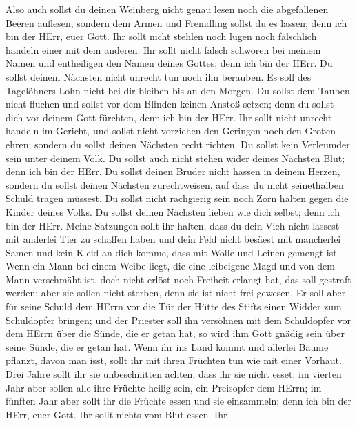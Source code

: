  Also auch sollst du deinen Weinberg nicht genau lesen noch
die abgefallenen Beeren auflesen, sondern dem Armen und Fremdling sollst
du es lassen; denn ich bin der HErr, euer Gott.  Ihr sollt
nicht stehlen noch lügen noch fälschlich handeln einer mit dem anderen.
 Ihr sollt nicht falsch schwören bei meinem Namen und
entheiligen den Namen deines Gottes; denn ich bin der HErr.
 Du sollst deinem Nächsten nicht unrecht tun noch ihn
berauben. Es soll des Tagelöhners Lohn nicht bei dir bleiben bis an den
Morgen.  Du sollst dem Tauben nicht fluchen und sollst vor
dem Blinden keinen Anstoß setzen; denn du sollst dich vor deinem Gott
fürchten, denn ich bin der HErr.  Ihr sollt nicht unrecht
handeln im Gericht, und sollst nicht vorziehen den Geringen noch den
Großen ehren; sondern du sollst deinen Nächsten recht richten.
 Du sollst kein Verleumder sein unter deinem Volk. Du
sollst auch nicht stehen wider deines Nächsten Blut; denn ich bin der
HErr.  Du sollst deinen Bruder nicht hassen in deinem
Herzen, sondern du sollst deinen Nächsten zurechtweisen, auf dass du
nicht seinethalben Schuld tragen müssest.  Du sollst nicht
rachgierig sein noch Zorn halten gegen die Kinder deines Volks. Du
sollst deinen Nächsten lieben wie dich selbst; denn ich bin der HErr.
 Meine Satzungen sollt ihr halten, dass du dein Vieh nicht
lassest mit anderlei Tier zu schaffen haben und dein Feld nicht besäest
mit mancherlei Samen und kein Kleid an dich komme, dass mit Wolle und
Leinen gemengt ist.  Wenn ein Mann bei einem Weibe liegt,
die eine leibeigene Magd und von dem Mann verschmäht ist, doch nicht
erlöst noch Freiheit erlangt hat, das soll gestraft werden; aber sie
sollen nicht sterben, denn sie ist nicht frei gewesen.  Er
soll aber für seine Schuld dem HErrn vor die Tür der Hütte des Stifts
einen Widder zum Schuldopfer bringen;  und der Priester
soll ihn versöhnen mit dem Schuldopfer vor dem HErrn über die Sünde, die
er getan hat, so wird ihm Gott gnädig sein über seine Sünde, die er
getan hat.  Wenn ihr ins Land kommt und allerlei Bäume
pflanzt, davon man isst, sollt ihr mit ihren Früchten tun wie mit einer
Vorhaut. Drei Jahre sollt ihr sie unbeschnitten achten, dass ihr sie
nicht esset;  im vierten Jahr aber sollen alle ihre Früchte
heilig sein, ein Preisopfer dem HErrn;  im fünften Jahr
aber sollt ihr die Früchte essen und sie einsammeln; denn ich bin der
HErr, euer Gott.  Ihr sollt nichts vom Blut essen. Ihr
